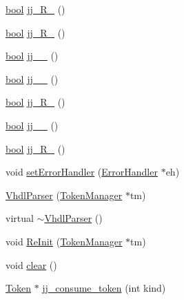 \begin{DoxyCompactItemize}
\item 
\hyperlink{qglobal_8h_a1062901a7428fdd9c7f180f5e01ea056}{bool} \hyperlink{classvhdl_1_1parser_1_1_vhdl_parser_af95de6afb1d796f5932c4e02114aa24d}{jj\+\_\+R\+\_} ()
\item 
\hyperlink{qglobal_8h_a1062901a7428fdd9c7f180f5e01ea056}{bool} \hyperlink{classvhdl_1_1parser_1_1_vhdl_parser_a279ad1b080aab7d82c44a0b65e90cc19}{jj\+\_\+R\+\_} ()
\item 
\hyperlink{qglobal_8h_a1062901a7428fdd9c7f180f5e01ea056}{bool} \hyperlink{classvhdl_1_1parser_1_1_vhdl_parser_a8103d0f48e27311d5b3a87bd81499e45}{jj\+\_\+\_} ()
\item 
\hyperlink{qglobal_8h_a1062901a7428fdd9c7f180f5e01ea056}{bool} \hyperlink{classvhdl_1_1parser_1_1_vhdl_parser_a6535f20fa09df61f1b836f9958d7938f}{jj\+\_\+\_} ()
\item 
\hyperlink{qglobal_8h_a1062901a7428fdd9c7f180f5e01ea056}{bool} \hyperlink{classvhdl_1_1parser_1_1_vhdl_parser_a25fa562ca244e2082908ed27f941bca8}{jj\+\_\+R\+\_} ()
\item 
\hyperlink{qglobal_8h_a1062901a7428fdd9c7f180f5e01ea056}{bool} \hyperlink{classvhdl_1_1parser_1_1_vhdl_parser_a89b148e6d2d536489fe71d3850039598}{jj\+\_\+\_} ()
\item 
\hyperlink{qglobal_8h_a1062901a7428fdd9c7f180f5e01ea056}{bool} \hyperlink{classvhdl_1_1parser_1_1_vhdl_parser_a7a052b8156fab086ccbddf85464cae32}{jj\+\_\+R\+\_} ()
\item 
void \hyperlink{classvhdl_1_1parser_1_1_vhdl_parser_afe8b17ac122b95c8874c537f798f9656}{set\+Error\+Handler} (\hyperlink{classvhdl_1_1parser_1_1_error_handler}{Error\+Handler} $\ast$eh)
\item 
\hyperlink{classvhdl_1_1parser_1_1_vhdl_parser_a4ac60afc7137c9a22639046e120005d6}{Vhdl\+Parser} (\hyperlink{classvhdl_1_1parser_1_1_token_manager}{Token\+Manager} $\ast$tm)
\item 
virtual \hyperlink{classvhdl_1_1parser_1_1_vhdl_parser_ac58fbca3ae81b34aec4ee4e9678a3ac7}{$\sim$\+Vhdl\+Parser} ()
\item 
void \hyperlink{classvhdl_1_1parser_1_1_vhdl_parser_a063c2ccf37a1adfeaeb84fe921f2f17e}{Re\+Init} (\hyperlink{classvhdl_1_1parser_1_1_token_manager}{Token\+Manager} $\ast$tm)
\item 
void \hyperlink{classvhdl_1_1parser_1_1_vhdl_parser_a2441361a86aac56afa93bedb5eecf68d}{clear} ()
\item 
\hyperlink{classvhdl_1_1parser_1_1_token}{Token} $\ast$ \hyperlink{classvhdl_1_1parser_1_1_vhdl_parser_a978cf51ce0b9b4d4c7d0d34520bd19fb}{jj\+\_\+consume\+\_\+token} (int kind)

\end{DoxyCompactItemize}
